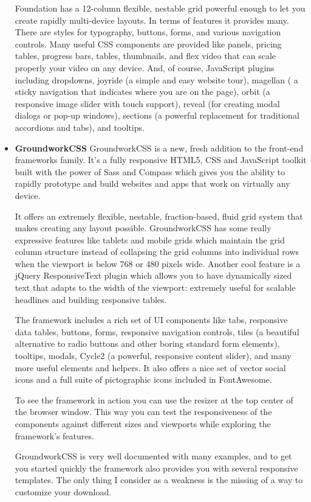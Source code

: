 \begin{itemize}
Foundation has a 12-column flexible, nestable grid powerful enough to let you create rapidly multi-device layouts. In terms of features it provides many. There are styles for typography, buttons, forms, and various navigation controls. Many useful CSS components are provided like panels, pricing tables, progress bars, tables, thumbnails, and flex video that can scale properly your video on any device. And, of course, JavaScript plugins including dropdowns, joyride (a simple and easy website tour), magellan ( a sticky navigation that indicates where you are on the page), orbit (a responsive image slider with touch support), reveal (for creating modal dialogs or pop-up windows),  sections (a powerful replacement for traditional accordions and tabs), and tooltips.
\item \textbf{GroundworkCSS}
\newline
GroundworkCSS is a new, fresh addition to the front-end frameworks family. It’s a fully responsive HTML5, CSS and JavaScript toolkit built with the power of Sass and Compass which gives you the ability to rapidly prototype and build websites and apps that work on virtually any device.

It offers an extremely flexible, nestable, fraction-based, fluid grid system that makes creating any layout possible. GroundworkCSS has some really expressive features like tablets and mobile grids which maintain the grid column structure instead of collapsing the grid columns into individual rows when the viewport is below 768 or 480 pixels wide. Another cool feature is a jQuery ResponsiveText plugin which allows you to have dynamically sized text that adapts to the width of the viewport: extremely useful for scalable headlines and building responsive tables.

The framework includes a rich set of UI components like tabs, responsive data tables, buttons, forms, responsive navigation controls, tiles (a beautiful alternative to radio buttons and other boring standard form elements), tooltips, modals, Cycle2 (a powerful, responsive content slider), and many more useful elements and helpers. It also offers a nice set of vector social icons and a full suite of pictographic icons included in FontAwesome.

To see the framework in action you can use the resizer at the top center of the browser window. This way you can test the responsiveness of the components against different sizes and viewports while exploring the framework’s features.

GroundworkCSS is very well documented with many examples, and to get you started quickly the framework also provides you with several responsive templates. The only thing I consider as a weakness is the missing of a way to customize your download.


\end{itemize}
